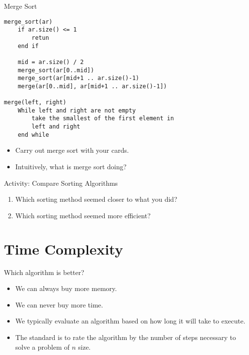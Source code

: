 \documentclass[]{beamer}
\begin{document}
\begin{frame}[fragile]{Merge Sort}
\begin{verbatim}
merge_sort(ar)
    if ar.size() <= 1 
        retun
    end if

    mid = ar.size() / 2
    merge_sort(ar[0..mid])
    merge_sort(ar[mid+1 .. ar.size()-1) 
    merge(ar[0..mid], ar[mid+1 .. ar.size()-1])

merge(left, right)
    While left and right are not empty
        take the smallest of the first element in
        left and right
    end while
\end{verbatim}

\begin{itemize}[<+->]
    \item Carry out merge sort with your cards.
    \item Intuitively, what is merge sort doing?
\end{itemize}
\end{frame}

\begin{frame}{Activity: Compare Sorting Algorithms}
    \begin{enumerate}[<+->]
        \item Which sorting method seemed closer to what you did?
        \item Which sorting method seemed more efficient?
    \end{enumerate}
\end{frame}

\section{Time Complexity}
\begin{frame}{Which algorithm is better?}
\begin{itemize}[<+->]
    \item We can always buy more memory.
    \item We can never buy more time.
    \item We typically evaluate an algorithm based on how long it will
        take to execute.
    \item The standard is to rate the algorithm by the number of steps
        necessary to solve a problem of $n$ size.
\end{itemize}
\end{frame}
\end{document}
